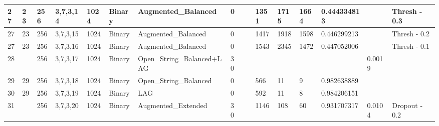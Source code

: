 \documentclass[conference]{IEEEtran}
\begin{document}
\begin{table}[!ht]
\begin{adjustbox}{width=\textwidth}
\begin{tabular}{|l|l|l|l|l|l|l|l|l|l|l|l|l|l|l|}
        27 & 23 & 256 & 3,7,3,14 & 1024 & Binary & Augmented\_Balanced & 0 & ~ & 1351 & 1715 & 1664 & 0.444334813 & ~ & Thresh - 0.3 \\ \hline
        27 & 23 & 256 & 3,7,3,15 & 1024 & Binary & Augmented\_Balanced & 0 & ~ & 1417 & 1918 & 1598 & 0.446299213 & ~ & Thresh - 0.2 \\ \hline
        27 & 23 & 256 & 3,7,3,16 & 1024 & Binary & Augmented\_Balanced & 0 & ~ & 1543 & 2345 & 1472 & 0.447052006 & ~ & Thresh - 0.1 \\ \hline
        28 & ~ & 256 & 3,7,3,17 & 1024 & Binary & Open\_String\_Balanced+LAG & 30 & ~ & ~ & ~ & ~ & ~ & 0.0019 & ~ \\ \hline
        29 & 29 & 256 & 3,7,3,18 & 1024 & Binary & Open\_String\_Balanced & 0 & ~ & 566 & 11 & 9 & 0.982638889 & ~ & ~ \\ \hline
        30 & 29 & 256 & 3,7,3,19 & 1024 & Binary & LAG & 0 & ~ & 592 & 11 & 8 & 0.984206151 & ~ & ~ \\ \hline
        31 & ~ & 256 & 3,7,3,20 & 1024 & Binary & Augmented\_Extended & 30 & ~ & 1146 & 108 & 60 & 0.931707317 & 0.0104 & Dropout - 0.2 \\ \hline
        
     \end{tabular}
 \end{adjustbox}
 \end{table}
\end{document}
